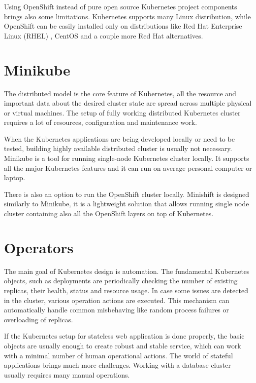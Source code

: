 \documentclass[
  digital, %
  twoside, %
  table,   %
  nolof,   %
  nolot,   %
]{fithesis3}
\begin{document}
Using OpenShift instead of pure open source Kubernetes project components brings also some limitations. Kubernetes supports many Linux distribution, while OpenShift can be easily installed only on distributions like Red Hat Enterprise Linux (RHEL) \cite{rhel}, CentOS \cite{centos} and a couple more Red Hat alternatives.

\section{Minikube} \label{sec:minikube}
The distributed model is the core feature of Kubernetes, all the resource and important data about the desired cluster state are spread across multiple physical or virtual machines. The setup of fully working distributed Kubernetes cluster requires a lot of resources, configuration and maintenance work.

When the Kubernetes applications are being developed locally or need to be tested, building highly available distributed cluster is usually not necessary. Minikube \cite{minikube} is a tool for running single-node Kubernetes cluster locally. It supports all the major Kubernetes features and it can run on average personal computer or laptop.

There is also an option to run the OpenShift cluster locally. Minishift \cite{minishift} is designed similarly to Minikube, it is a lightweight solution that allows running single node cluster containing also all the OpenShift layers on top of Kubernetes.

\section{Operators} \label{sec:operators}
The main goal of Kubernetes design is automation. The fundamental Kubernetes objects, such as deployments are periodically checking the number of existing replicas, their health, status and resource usage. In case some issues are detected in the cluster, various operation actions are executed. This mechanism can automatically handle common misbehaving like random process failures or overloading of replicas.

If the Kubernetes setup for stateless web application is done properly, the basic objects are usually enough to create robust and stable service, which can work with a minimal number of human operational actions. The world of stateful applications brings much more challenges. Working with a database cluster usually requires many manual operations.
\end{document}
